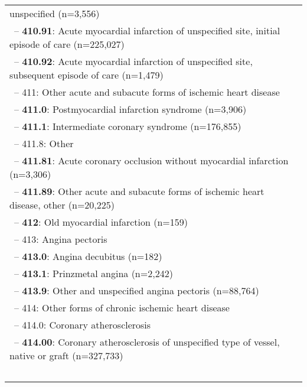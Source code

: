 \begin{longtable}{p{\textwidth}}
unspecified (n=3,556)} \\ \-\ \hspace{40pt}\footnotesize{-- {\color{ForestGreen} \textbf{410.91}}: Acute myocardial infarction of unspecified site, initial episode of care (n=225,027)} \\ \-\ \hspace{40pt}\footnotesize{-- {\color{ForestGreen} \textbf{410.92}}: Acute myocardial infarction of unspecified site, subsequent episode of care (n=1,479)} \\ \-\ \hspace{20pt}\footnotesize{-- 411: Other acute and subacute forms of ischemic heart disease} \\ \-\ \hspace{30pt}\footnotesize{-- {\color{ForestGreen} \textbf{411.0}}: Postmyocardial infarction syndrome (n=3,906)} \\ \-\ \hspace{30pt}\footnotesize{-- {\color{ForestGreen} \textbf{411.1}}: Intermediate coronary syndrome (n=176,855)} \\ \-\ \hspace{30pt}\footnotesize{-- 411.8: Other} \\ \-\ \hspace{40pt}\footnotesize{-- {\color{ForestGreen} \textbf{411.81}}: Acute coronary occlusion without myocardial infarction (n=3,306)} \\ \-\ \hspace{40pt}\footnotesize{-- {\color{ForestGreen} \textbf{411.89}}: Other acute and subacute forms of ischemic heart disease, other (n=20,225)} \\ \-\ \hspace{20pt}\footnotesize{-- {\color{ForestGreen} \textbf{412}}: Old myocardial infarction (n=159)} \\ \-\ \hspace{20pt}\footnotesize{-- 413: Angina pectoris} \\ \-\ \hspace{30pt}\footnotesize{-- {\color{ForestGreen} \textbf{413.0}}: Angina decubitus (n=182)} \\ \-\ \hspace{30pt}\footnotesize{-- {\color{ForestGreen} \textbf{413.1}}: Prinzmetal angina (n=2,242)} \\ \-\ \hspace{30pt}\footnotesize{-- {\color{ForestGreen} \textbf{413.9}}: Other and unspecified angina pectoris (n=88,764)} \\ \-\ \hspace{20pt}\footnotesize{-- 414: Other forms of chronic ischemic heart disease} \\ \-\ \hspace{30pt}\footnotesize{-- 414.0: Coronary atherosclerosis} \\ \-\ \hspace{40pt}\footnotesize{-- {\color{ForestGreen} \textbf{414.00}}: Coronary atherosclerosis of unspecified type of vessel, native or graft (n=327,733)} \\ \-\ \hspace{40pt}\footnotesize{-- {\color{ForestGreen} \textbf{414.01}}: Coronary 
\end{longtable}

